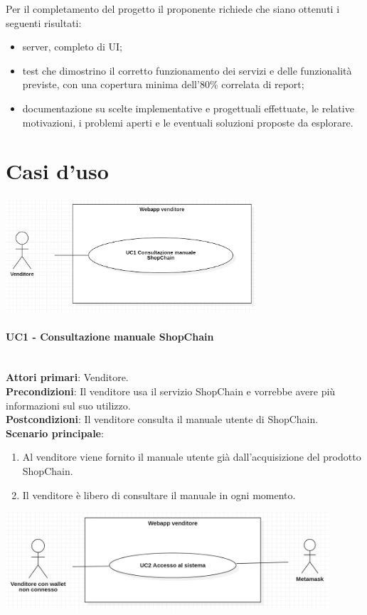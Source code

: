 \documentclass[a4paper, 12pt]{article}
\begin{document}
Per il completamento del progetto il proponente richiede che siano ottenuti i seguenti risultati:
\begin{itemize}
\item server, completo di UI;
\item test che dimostrino il corretto funzionamento dei servizi e delle funzionalità previste, con una copertura minima dell'80\% correlata di report;
\item documentazione su scelte implementative e progettuali effettuate, le relative motivazioni, i problemi aperti e le eventuali soluzioni proposte da esplorare.
\end{itemize}

\section{Casi d'uso}

\includegraphics[width=0.7\textwidth]{UC_WAV1}

\paragraph{UC1 - Consultazione manuale ShopChain}\\
\textbf{Attori primari}: Venditore.\\
\textbf{Precondizioni}: Il venditore usa il servizio ShopChain e vorrebbe avere più informazioni sul suo utilizzo.\\
\textbf{Postcondizioni}: Il venditore consulta il manuale utente di ShopChain.\\
\textbf{Scenario principale}:\\
\begin{enumerate}
\item Al venditore viene fornito il manuale utente già dall'acquisizione del prodotto ShopChain.
\item Il venditore è libero di consultare il manuale in ogni momento.
\end{enumerate}

\includegraphics[width=0.9\textwidth]{UC_WAV2}
\end{document}
